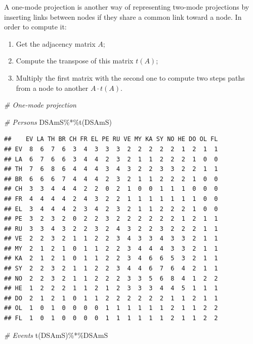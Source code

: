 \documentclass[
  notitlepage,
  onecolumn,
  openany]{book}
\newenvironment{Shaded}{\begin{snugshade}}{\end{snugshade}}
\newcommand{\CommentTok}[1]{\textcolor[rgb]{0.56,0.35,0.01}{\textit{#1}}}
\newcommand{\FunctionTok}[1]{\textcolor[rgb]{0.00,0.00,0.00}{#1}}
\newcommand{\NormalTok}[1]{#1}
\newcommand{\SpecialCharTok}[1]{\textcolor[rgb]{0.00,0.00,0.00}{#1}}
\providecommand{\tightlist}{%
  \setlength{\itemsep}{0pt}\setlength{\parskip}{0pt}}
\begin{document}
A one-mode projection is another way of representing two-mode projections by inserting links between nodes if they share a common link toward a node. In order to compute it:

\begin{enumerate}
\def\labelenumi{\arabic{enumi}.}
\tightlist
\item
  Get the adjacency matrix \(A\);
\item
  Compute the transpose of this matrix \(t(A)\);
\item
  Multiply the first matrix with the second one to compute two steps paths from a node to another \(A \cdot t(A)\).
\end{enumerate}

\begin{Shaded}
\begin{Highlighting}[]
\CommentTok{\# One{-}mode projection}

\CommentTok{\# Persons}
\NormalTok{DSAmS}\SpecialCharTok{\%*\%}\FunctionTok{t}\NormalTok{(DSAmS)}
\end{Highlighting}
\end{Shaded}

\begin{verbatim}
##    EV LA TH BR CH FR EL PE RU VE MY KA SY NO HE DO OL FL
## EV  8  6  7  6  3  4  3  3  3  2  2  2  2  2  1  2  1  1
## LA  6  7  6  6  3  4  4  2  3  2  1  1  2  2  2  1  0  0
## TH  7  6  8  6  4  4  4  3  4  3  2  2  3  3  2  2  1  1
## BR  6  6  6  7  4  4  4  2  3  2  1  1  2  2  2  1  0  0
## CH  3  3  4  4  4  2  2  0  2  1  0  0  1  1  1  0  0  0
## FR  4  4  4  4  2  4  3  2  2  1  1  1  1  1  1  1  0  0
## EL  3  4  4  4  2  3  4  2  3  2  1  1  2  2  2  1  0  0
## PE  3  2  3  2  0  2  2  3  2  2  2  2  2  2  1  2  1  1
## RU  3  3  4  3  2  2  3  2  4  3  2  2  3  2  2  2  1  1
## VE  2  2  3  2  1  1  2  2  3  4  3  3  4  3  3  2  1  1
## MY  2  1  2  1  0  1  1  2  2  3  4  4  4  3  3  2  1  1
## KA  2  1  2  1  0  1  1  2  2  3  4  6  6  5  3  2  1  1
## SY  2  2  3  2  1  1  2  2  3  4  4  6  7  6  4  2  1  1
## NO  2  2  3  2  1  1  2  2  2  3  3  5  6  8  4  1  2  2
## HE  1  2  2  2  1  1  2  1  2  3  3  3  4  4  5  1  1  1
## DO  2  1  2  1  0  1  1  2  2  2  2  2  2  1  1  2  1  1
## OL  1  0  1  0  0  0  0  1  1  1  1  1  1  2  1  1  2  2
## FL  1  0  1  0  0  0  0  1  1  1  1  1  1  2  1  1  2  2
\end{verbatim}

\begin{Shaded}
\begin{Highlighting}[]
\CommentTok{\# Events}
\FunctionTok{t}\NormalTok{(DSAmS)}\SpecialCharTok{\%*\%}\NormalTok{DSAmS }
\end{Highlighting}
\end{Shaded}
\end{document}
